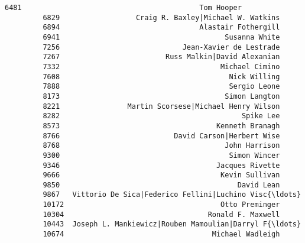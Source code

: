 \documentclass[11pt]{article}
\begin{document}
\begin{Verbatim}[commandchars=\\\{\}]
         6481                                          Tom Hooper   
         6829                  Craig R. Baxley|Michael W. Watkins   
         6894                                 Alastair Fothergill   
         6941                                       Susanna White   
         7256                             Jean-Xavier de Lestrade   
         7267                         Russ Malkin|David Alexanian   
         7332                                      Michael Cimino   
         7608                                        Nick Willing   
         7888                                        Sergio Leone   
         8173                                       Simon Langton   
         8221                Martin Scorsese|Michael Henry Wilson   
         8282                                           Spike Lee   
         8573                                     Kenneth Branagh   
         8766                           David Carson|Herbert Wise   
         8768                                       John Harrison   
         9300                                        Simon Wincer   
         9346                                     Jacques Rivette   
         9666                                      Kevin Sullivan   
         9850                                          David Lean   
         9867   Vittorio De Sica|Federico Fellini|Luchino Visc{\ldots}   
         10172                                     Otto Preminger   
         10304                                  Ronald F. Maxwell   
         10443  Joseph L. Mankiewicz|Rouben Mamoulian|Darryl F{\ldots}   
         10674                                   Michael Wadleigh   
         

\end{Verbatim}
\end{document}
